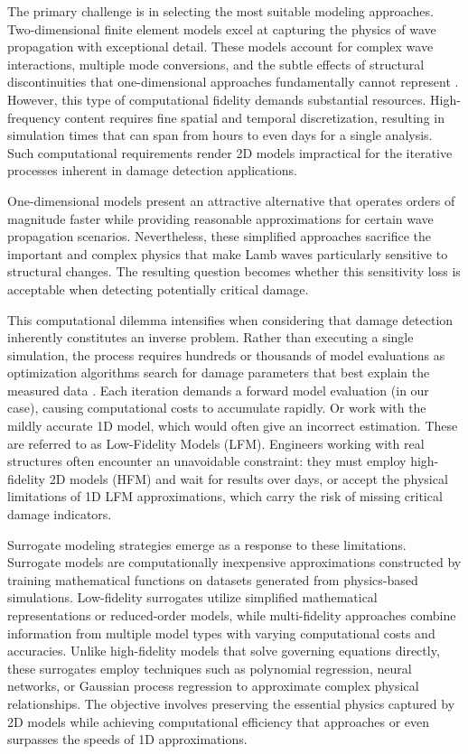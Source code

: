 \documentclass[12pt,a4paper]{report}
\begin{document}
The primary challenge is in selecting the most suitable modeling approaches. Two-dimensional finite element models excel at capturing the physics of wave propagation with exceptional detail. These models account for complex wave interactions, multiple mode conversions, and the subtle effects of structural discontinuities that one-dimensional approaches fundamentally cannot represent \citep{Fan2024}. However, this type of computational fidelity demands substantial resources. High-frequency content requires fine spatial and temporal discretization, resulting in simulation times that can span from hours to even days for a single analysis. Such computational requirements render 2D models impractical for the iterative processes inherent in damage detection applications.

One-dimensional models present an attractive alternative that operates orders of magnitude faster while providing reasonable approximations for certain wave propagation scenarios. Nevertheless, these simplified approaches sacrifice the important and complex physics that make Lamb waves particularly sensitive to structural changes. The resulting question becomes whether this sensitivity loss is acceptable when detecting potentially critical damage.

This computational dilemma intensifies when considering that damage detection inherently constitutes an inverse problem. Rather than executing a single simulation, the process requires hundreds or thousands of model evaluations as optimization algorithms search for damage parameters that best explain the measured data \citep{YU2023107030}. Each iteration demands a forward model evaluation (in our case), causing computational costs to accumulate rapidly. Or work with the mildly accurate 1D model, which would often give an incorrect estimation. These are referred to as Low-Fidelity Models (LFM). Engineers working with real structures often encounter an unavoidable constraint: they must employ high-fidelity 2D models (HFM) and wait for results over days, or accept the physical limitations of 1D LFM approximations, which carry the risk of missing critical damage indicators.

Surrogate modeling strategies emerge as a response to these limitations. Surrogate models are computationally inexpensive approximations constructed by training mathematical functions on datasets generated from physics-based simulations. Low-fidelity surrogates utilize simplified mathematical representations or reduced-order models, while multi-fidelity approaches combine information from multiple model types with varying computational costs and accuracies. Unlike high-fidelity models that solve governing equations directly, these surrogates employ techniques such as polynomial regression, neural networks, or Gaussian process regression to approximate complex physical relationships. The objective involves preserving the essential physics captured by 2D models while achieving computational efficiency that approaches or even surpasses the speeds of 1D approximations.
\end{document}
